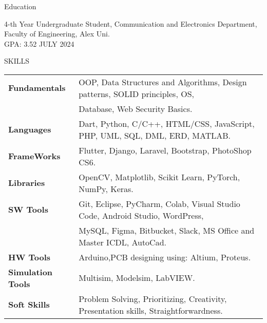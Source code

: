 \documentclass{resume} %
\begin{document}
\begin{rSection}{PROJECTS} 
    \href{https://github.com/AsmaaJAH}{https://github.com/AsmaaJAH }}  
\end{rSection}





\begin{rSection}{Education}

{ 4-th Year Undergraduate Student, Communication and Electronics Department}, Faculty of Engineering, Alex Uni.\\
GPA: 3.52   \hfill {JULY 2024}


\end{rSection}


\begin{rSection}{SKILLS}
\begin{tabular}{ @{} >{\bfseries}l @{\hspace{6ex}} l }
Fundamentals & OOP, Data Structures and Algorithms, Design patterns, SOLID principles, OS,\\ & Database, Web Security Basics.\\
Languages & Dart, Python, C/C++, HTML/CSS, JavaScript, PHP, UML, SQL, DML, ERD, MATLAB.\\
FrameWorks &  Flutter, Django, Laravel, Bootstrap,  PhotoShop CS6.\\
Libraries & OpenCV, Matplotlib, Scikit Learn, PyTorch, NumPy, Keras.\\
SW Tools & Git, Eclipse, PyCharm, Colab, Visual Studio Code, Android Studio, WordPress,\\ & MySQL, Figma, Bitbucket, Slack, MS Office and Master ICDL, AutoCad.\\
HW Tools & Arduino,PCB designing using: Altium, Proteus.\\
Simulation Tools& Multisim, Modelsim, LabVIEW.\\
Soft Skills &  Problem Solving, Prioritizing, Creativity, Presentation skills, Straightforwardness.\\
\end{tabular}\\
\end{rSection}
\end{document}
